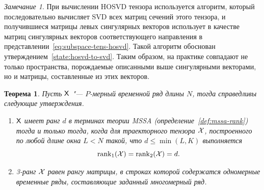 \documentclass[specialist,
    substylefile=spbu.rtx,
    subf,href,colorlinks=true, 12pt]{disser}
\theoremstyle{plain}
\newtheorem{theorem}{Теорема}
\theoremstyle{definition}
\newtheorem{definition}{Определение}[section]
\theoremstyle{remark}
\newtheorem*{remark}{Замечание}
\begin{document}
    \begin{remark}
        При вычислении HOSVD тензора используется алгоритм, который последовательно вычисляет SVD всех матриц сечений
        этого тензора, и получившиеся матрицы левых сингулярных векторов использует в качестве матриц сингулярных
        векторов соответствующего направления в представлении~\eqref{eq:subspace-tens-hosvd}.
        Такой алгоритм обоснован утверждением~\ref{state:hosvd-to-svd}.
        Таким образом, на практике совпадают не только пространства, порождаемые описанными выше сингулярными векторами,
        но и матрицы, составленные из этих векторов.
    \end{remark}

    \begin{theorem}
        \label{state:hosvd-mssa-rang}
        Пусть $\mathsf{X}$ "--- $P$-мерный временной ряд длины $N$, тогда справедливы следующие утверждения.
        \begin{enumerate}
            \item $\mathsf{X}$ имеет ранг $d$ в терминах теории \emph{MSSA} (определение~\ref{def:mssa-rank})
            тогда и только тогда, когда для траекторного тензора $\mathcal{X}$, построенного по любой длине окна
            $L<N$ такой, что $d \leqslant\min(L, K)$ выполняется
            \[\operatorname{rank}_1(\mathcal{X}) = \operatorname{rank}_2(\mathcal{X}) = d.\]
            \item 3-ранг $\mathcal{X}$ равен рангу матрицы,
            в строках которой содержатся одномерные временные ряды, составляющие заданный
            многомерный ряд.
        \end{enumerate}
    \end{theorem}
\end{document}
